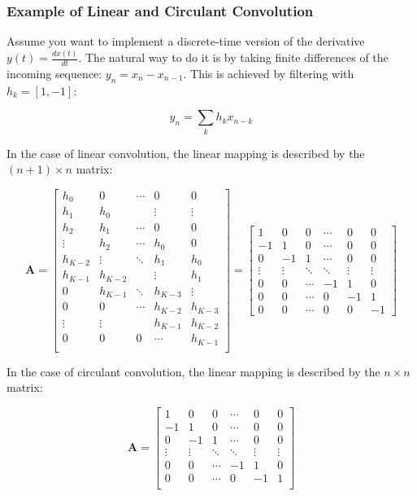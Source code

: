 \subsubsection*{Example of Linear and Circulant Convolution}
Assume you want to implement a discrete-time version of the derivative \( y(t) = \frac{dx(t)}{dt} \). The natural way to do it is by taking finite differences of the incoming sequence: \( y_n = x_n - x_{n-1} \). This is achieved by filtering with \( h_k = [1, -1] \):

\[
y_n = \sum_k h_k x_{n-k}
\]

In the case of linear convolution, the linear mapping is described by the \( (n + 1) \times n \) matrix:

\[
\mathbf{A} = \begin{bmatrix}
h_0&0&\cdots&0&0\\
h_1&h_0&&\vdots&\vdots\\
h_2&h_1&\cdots&0&0\\
\vdots&h_2&\cdots&h_0&0\\
h_{K-2}&\vdots&\ddots&h_1&h_0\\
h_{K-1}&h_{K-2}&&\vdots&h_1\\
0&h_{K-1}&\ddots&h_{K-3}&\vdots
\\0&0&\cdots&h_{K-2}&h_{K-3}\\
\vdots&\vdots&&h_{K-1}&h_{K-2}\\
0&0&0&\cdots&h_{K-1}\\
\end{bmatrix}=\begin{bmatrix}
1 & 0 & 0 & \cdots &0&0\\
-1& 1 & 0& \cdots &0&0\\
0 & -1& 1 & \cdots &0&0\\
\vdots&\vdots&\ddots& \ddots&\vdots&\vdots\\
0 & 0 & \cdots  & -1& 1 & 0\\
0 & 0 & \cdots  & 0 & -1 & 1 \\
0 & 0 & \cdots  & 0 &  0 & -1
\end{bmatrix}
\]

In the case of circulant convolution, the linear mapping is described by the \( n \times n \) matrix:

\[
\mathbf{A} = \begin{bmatrix}
1 & 0 & 0 & \cdots &0&0\\
-1& 1 & 0& \cdots &0&0\\
0 & -1& 1 & \cdots &0&0\\
\vdots&\vdots&\ddots& \ddots&\vdots&\vdots\\
0 & 0 & \cdots  & -1& 1 & 0\\
0 & 0 & \cdots  & 0 & -1 & 1 \\
\end{bmatrix}
\]




